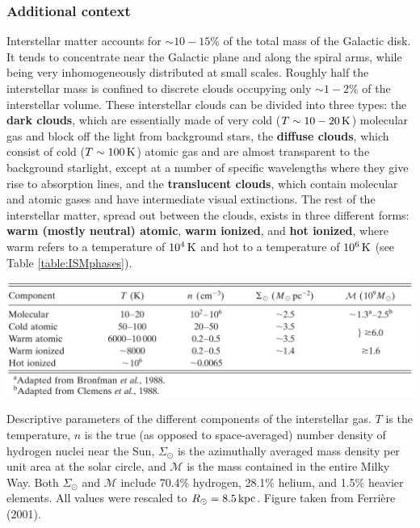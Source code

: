 \documentclass[a4paper,10pt]{article}
\begin{document}
\subsubsection{Additional context}

Interstellar matter accounts for $\sim10-15\%$ of the total
mass of the Galactic disk. It tends to concentrate near the Galactic plane and along the spiral arms, while being very inhomogeneously distributed at small scales. Roughly half the interstellar mass is confined to discrete clouds occupying only $\sim1-2\%$ of the interstellar volume. These interstellar clouds can be divided into three types: the \textbf{dark clouds}, which are essentially made of very cold ($T\sim10-20\,{\rm K}$) molecular gas and block off the light from background stars, the \textbf{diffuse clouds}, which consist of cold ($T\sim100\,{\rm K}$) atomic gas and are almost transparent to the background starlight, except at a number of specific wavelengths where they give rise to absorption lines, and the \textbf{translucent clouds}, which contain molecular and atomic gases and have intermediate visual extinctions. The rest of the interstellar matter, spread out between the clouds, exists in three different forms: \textbf{warm (mostly neutral) atomic}, \textbf{warm ionized}, and \textbf{hot ionized}, where warm refers to a temperature of $10^4\,{\rm K}$ and hot to a temperature of $10^6\,{\rm K}$ (see Table \ref{table:ISMphases}).

\begin{table}[h]
    \centering
    \includegraphics[width=14cm]{figures/ISMphases_table.png}
    \caption{\footnotesize{Descriptive parameters of the different components of the interstellar gas. $T$ is the temperature, $n$ is the true (as opposed to space-averaged) number density of hydrogen nuclei near the Sun, $\Sigma_\odot$ is the azimuthally averaged mass density per unit area at the solar circle, and $\mathcal{M}$ is the mass contained in the entire Milky Way. Both $\Sigma_\odot$ and $\mathcal{M}$ include 70.4\% hydrogen, 28.1\% helium, and 1.5\% heavier elements. All values were rescaled to $R_\odot=8.5\,{\rm kpc}$. Figure taken from Ferri\`ere (2001).}}
    \label{table:ISMphases}
\end{table}
\end{document}
